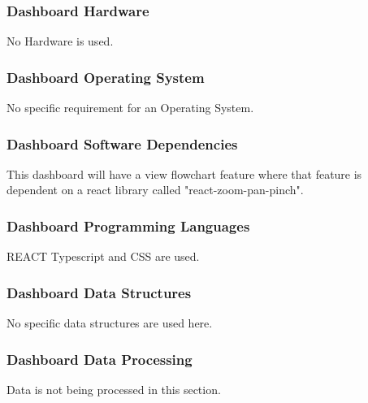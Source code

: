 \subsubsection{Dashboard Hardware}
No Hardware is used.

\subsubsection{Dashboard Operating System}
No specific requirement for an Operating System.

\subsubsection{Dashboard Software Dependencies}
This dashboard will have a view flowchart feature where that feature is dependent on a react library called "react-zoom-pan-pinch".

\subsubsection{Dashboard Programming Languages}
REACT Typescript and CSS are used.

\subsubsection{Dashboard Data Structures}
No specific data structures are used here.

\subsubsection{Dashboard Data Processing}
Data is not being processed in this section.


